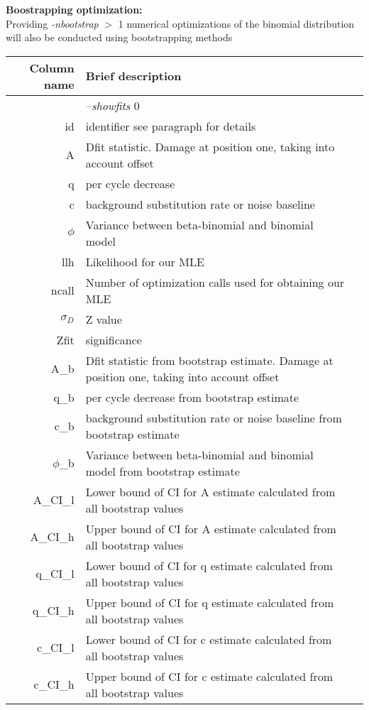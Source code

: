 \documentclass[10pt]{article}
\begin{document}
\pagebreak
\noindent
\textbf{Boostrapping optimization:} \\ \noindent
Providing \textit{-nbootstrap} $>$ 1 numerical optimizations of the binomial distribution will also be conducted using bootstrapping methods
\begin{table}[h]
\begin{tabular}{rll}
  \hline
  {\bf Column name} & {\bf Brief description} \\
  \hline
  {\sf } & \textit{--showfits} 0 \\ \hline  
  {\sf id} & identifier see paragraph for details\\
  {\sf A} & Dfit statistic. Damage at position one, taking into account offset\\
  {\sf q} & per cycle decrease\\
  {\sf c} & background substitution rate or noise baseline\\ 
  {\sf $\phi$} & Variance between beta-binomial and binomial model\\
  {\sf llh} & Likelihood for our MLE\\
  {\sf ncall} & Number of optimization calls used for obtaining our MLE\\
  {\sf $\sigma_D$} & Z value\\
  {\sf Zfit} & significance\\
  {\sf A\_b} & Dfit statistic from bootstrap estimate. Damage at position one, taking into account offset\\
  {\sf q\_b} & per cycle decrease from bootstrap estimate\\
  {\sf c\_b} & background substitution rate or noise baseline from bootstrap estimate\\ 
  {\sf $\phi$\_b} & Variance between beta-binomial and binomial model from bootstrap estimate\\
  {\sf A\_CI\_l} & Lower bound of CI for A estimate calculated from all bootstrap values \\
  {\sf A\_CI\_h} & Upper bound of CI for A estimate calculated from all bootstrap values \\
  {\sf q\_CI\_l} & Lower bound of CI for q estimate calculated from all bootstrap values \\
  {\sf q\_CI\_h} & Upper bound of CI for q estimate calculated from all bootstrap values \\
  {\sf c\_CI\_l} & Lower bound of CI for c estimate calculated from all bootstrap values \\
  {\sf c\_CI\_h} & Upper bound of CI for c estimate calculated from all bootstrap values \\

\end{tabular}
\end{table}
\end{document}
